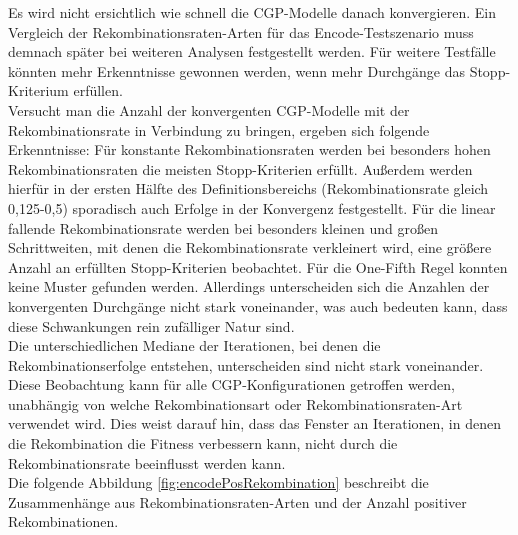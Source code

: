 Es wird nicht ersichtlich wie schnell die CGP-Modelle danach konvergieren.
Ein Vergleich der Rekombinationsraten-Arten für das Encode-Testszenario muss demnach später bei weiteren Analysen festgestellt werden.
Für weitere Testfälle könnten mehr Erkenntnisse gewonnen werden, wenn mehr Durchgänge das Stopp-Kriterium erfüllen.\\
Versucht man die Anzahl der konvergenten CGP-Modelle mit der Rekombinationsrate in Verbindung zu bringen, ergeben sich folgende Erkenntnisse: Für konstante Rekombinationsraten werden bei besonders hohen Rekombinationsraten die meisten Stopp-Kriterien erfüllt. 
Außerdem werden hierfür in der ersten Hälfte des Definitionsbereichs (Rekombinationsrate gleich 0,125-0,5) sporadisch auch Erfolge in der Konvergenz festgestellt.
Für die linear fallende Rekombinationsrate werden bei besonders kleinen und großen Schrittweiten, mit denen die Rekombinationsrate verkleinert wird, eine größere Anzahl an erfüllten Stopp-Kriterien beobachtet.
Für die One-Fifth Regel konnten keine Muster gefunden werden.
Allerdings unterscheiden sich die Anzahlen der konvergenten Durchgänge nicht stark voneinander, was auch bedeuten kann, dass diese Schwankungen rein zufälliger Natur sind.\\
Die unterschiedlichen Mediane der Iterationen, bei denen die Re\-kom\-bi\-na\-tions\-er\-folge entstehen, unterscheiden sind nicht stark voneinander.
Diese Beobachtung kann für alle CGP-Konfigurationen getroffen werden, unabhängig von welche Rekombinationsart oder Re\-kom\-bi\-na\-tions\-ra\-ten-Art verwendet wird.
Dies weist darauf hin, dass das Fenster an Iterationen, in denen die Rekombination die Fitness verbessern kann, nicht durch die Rekombinationsrate beeinflusst werden kann.\\
Die folgende Abbildung \ref{fig:encodePosRekombination} beschreibt die Zusammenhänge aus Rekombinationsraten-Arten und der Anzahl positiver Rekombinationen.

